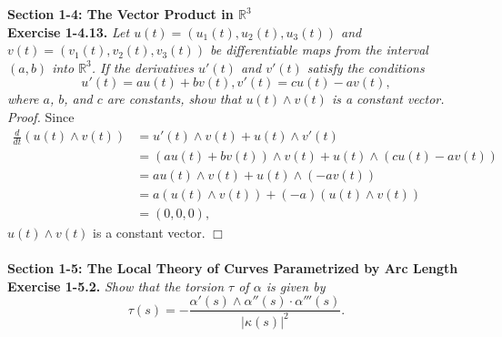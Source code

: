 \documentclass{article}
\begin{document}
\textbf{\large Section 1-4: The Vector Product in $\mathbb{R}^{3}$} \\

\textbf{Exercise 1-4.13.}
\emph{Let $u(t) = (u_1(t), u_2(t), u_3(t))$ and $v(t) = (v_1(t), v_2(t), v_3(t))$
be differentiable maps from the interval $(a,b)$ into $\mathbb{R}^3$.
If the derivatives $u'(t)$ and $v'(t)$ satisfy the conditions
$$u'(t) = au(t) + bv(t), v'(t) = cu(t) - av(t),$$
where $a$, $b$, and $c$ are constants, show that
$u(t) \wedge v(t)$ is a constant vector.} \\

\emph{Proof.}
Since
\begin{align*}
  \frac{d}{dt}(u(t) \wedge v(t))
  &= u'(t) \wedge v(t) + u(t) \wedge v'(t) \\
  &= (au(t) + bv(t))\wedge v(t) + u(t) \wedge (cu(t) - av(t)) \\
  &= au(t) \wedge v(t) + u(t) \wedge (-av(t)) \\
  &= a(u(t) \wedge v(t)) + (-a)(u(t) \wedge v(t)) \\
  &= (0, 0, 0),
\end{align*}
$u(t) \wedge v(t)$ is a constant vector.
$\Box$ \\\\






\textbf{\large Section 1-5: The Local Theory of Curves Parametrized by Arc Length} \\

\textbf{Exercise 1-5.2.}
\emph{Show that the torsion $\tau$ of $\alpha$ is given by
$$\tau(s) = -\frac{\alpha'(s) \wedge \alpha''(s) \cdot \alpha'''(s)}{|\kappa(s)|^2}.$$} \\
\end{document}
